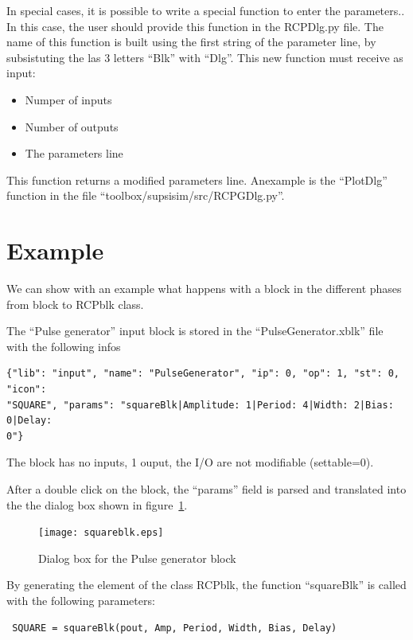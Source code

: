 In special cases, it is possible to write a special function to 
enter the parameters.. In this case, the user should provide this function in 
the RCPDlg.py file.
The name of this function is built using the first string of the parameter 
line, by subsistuting the las 3 letters ``Blk'' with ``Dlg''. This new function 
must receive as input:

\begin{itemize}
\item Numper of inputs
\item Number of outputs
\item The parameters line
\end{itemize}

This function returns a modified parameters line. Anexample is the ``PlotDlg'' 
function in the file ``toolbox/supsisim/src/RCPGDlg.py''.

\section{Example}
We can show with an example what happens with a block in the different phases 
from block to RCPblk class.

The ``Pulse generator'' input block is stored in the ``PulseGenerator.xblk'' 
file with 
the following infos

\tiny
\begin{verbatim}
{"lib": "input", "name": "PulseGenerator", "ip": 0, "op": 1, "st": 0, "icon": 
"SQUARE", "params": "squareBlk|Amplitude: 1|Period: 4|Width: 2|Bias: 0|Delay: 
0"}
\end{verbatim}
\normalsize

The block has no inputs, 1 ouput, the I/O are not modifiable (settable=0).

After a double click on the block, the ``params'' field is parsed and 
translated 
into the the dialog box shown in figure~\ref{Fig:squareblk}.

 \begin{figure}[htbp]	
 \centering
 \texttt{[image: squareblk.eps]}
 \caption{Dialog box for the Pulse generator block}
 \label{Fig:squareblk}
 \end{figure}

 By generating the element of the class RCPblk, the function ``squareBlk'' is 
called with the following parameters:
 
 \begin{verbatim}
 SQUARE = squareBlk(pout, Amp, Period, Width, Bias, Delay)
 \end{verbatim}
 
